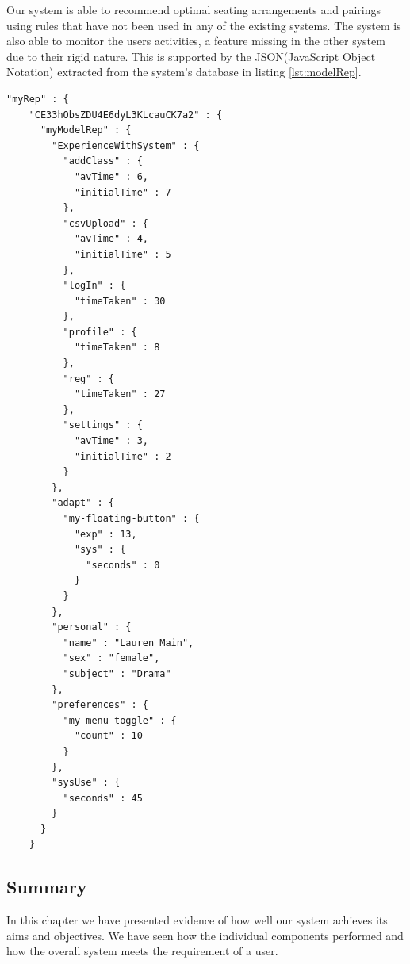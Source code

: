 Our system is able to recommend optimal seating arrangements and pairings using rules that have not been used in any of the existing systems. The system is also able to monitor the users activities, a feature missing in the other system due to their rigid nature. This is supported by the JSON(JavaScript Object Notation) extracted from the system's database in listing \ref{lst:modelRep}.
\begin{lstlisting}[caption={User Tracking Model Representation}, label={lst:modelRep}]
      "myRep" : {
    "CE33hObsZDU4E6dyL3KLcauCK7a2" : {
      "myModelRep" : {
        "ExperienceWithSystem" : {
          "addClass" : {
            "avTime" : 6,
            "initialTime" : 7
          },
          "csvUpload" : {
            "avTime" : 4,
            "initialTime" : 5
          },
          "logIn" : {
            "timeTaken" : 30
          },
          "profile" : {
            "timeTaken" : 8
          },
          "reg" : {
            "timeTaken" : 27
          },
          "settings" : {
            "avTime" : 3,
            "initialTime" : 2
          }
        },
        "adapt" : {
          "my-floating-button" : {
            "exp" : 13,
            "sys" : {
              "seconds" : 0
            }
          }
        },
        "personal" : {
          "name" : "Lauren Main",
          "sex" : "female",
          "subject" : "Drama"
        },
        "preferences" : {
          "my-menu-toggle" : {
            "count" : 10
          }
        },
        "sysUse" : {
          "seconds" : 45
        }
      }
    }
\end{lstlisting}


\subsection{Summary}
In this chapter we have presented evidence of how well our system achieves its aims and objectives. We have seen how the individual components performed and how the overall system meets the requirement of a user.